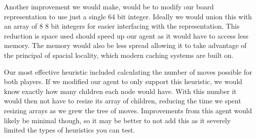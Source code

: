 \documentclass[12pt]{article}
\begin{document}
Another improvement we would make, would be to modify our board representation to use just a single 64 bit integer.
Ideally we would union this with an array of 8 8 bit integers for easier interfacing with the representation.
This reduction is space used should speed up our agent as it would have to access less memory.
The memory would also be less spread allowing it to take advantage of the principal of spacial locality, which modern caching systems are built on.

Our most effective heuristic included calculating the number of moves possible for both players.
If we modified our agent to only support this heuristic, we would know exactly how many children each node would have.
With this number it would then not have to resize its array of children, reducing the time we spent resizing arrays as we grew the tree of moves.
Improvements from this agent would likely be minimal though, so it may be better to not add this as it severely limited the types of heuristics you can test.
\end{document}
